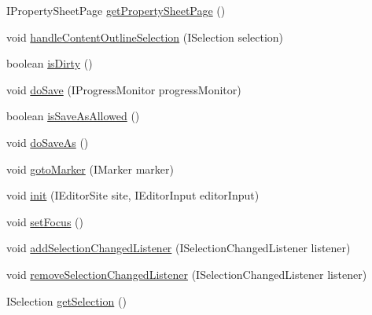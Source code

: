 \begin{DoxyCompactItemize}
\item 
I\-Property\-Sheet\-Page \hyperlink{classshootingmachineemfmodel_1_1presentation_1_1_shootingmachineemfmodel_editor_a897b207be7c583f065b40958b2db005c}{get\-Property\-Sheet\-Page} ()
\item 
void \hyperlink{classshootingmachineemfmodel_1_1presentation_1_1_shootingmachineemfmodel_editor_aff7e23f939ecf29b9648ae8f5eb70371}{handle\-Content\-Outline\-Selection} (I\-Selection selection)
\item 
boolean \hyperlink{classshootingmachineemfmodel_1_1presentation_1_1_shootingmachineemfmodel_editor_a7fd70f9ea055a835c70135220866e5ad}{is\-Dirty} ()
\item 
void \hyperlink{classshootingmachineemfmodel_1_1presentation_1_1_shootingmachineemfmodel_editor_a5c4817f88f4fbf12c72ef2a0aac06f84}{do\-Save} (I\-Progress\-Monitor progress\-Monitor)
\item 
boolean \hyperlink{classshootingmachineemfmodel_1_1presentation_1_1_shootingmachineemfmodel_editor_adb9b89b133860bb03109314d1358fede}{is\-Save\-As\-Allowed} ()
\item 
void \hyperlink{classshootingmachineemfmodel_1_1presentation_1_1_shootingmachineemfmodel_editor_a31e229dc1eafc259cad64918da13eb7c}{do\-Save\-As} ()
\item 
void \hyperlink{classshootingmachineemfmodel_1_1presentation_1_1_shootingmachineemfmodel_editor_a05a7f07d5fd373febe25b8ce6b2c8fdc}{goto\-Marker} (I\-Marker marker)
\item 
void \hyperlink{classshootingmachineemfmodel_1_1presentation_1_1_shootingmachineemfmodel_editor_a3195bcec0b92b023cabc23ec9c2ea758}{init} (I\-Editor\-Site site, I\-Editor\-Input editor\-Input)
\item 
void \hyperlink{classshootingmachineemfmodel_1_1presentation_1_1_shootingmachineemfmodel_editor_a9b206ef912c775a6da4a926d8f1479f7}{set\-Focus} ()
\item 
void \hyperlink{classshootingmachineemfmodel_1_1presentation_1_1_shootingmachineemfmodel_editor_addfa579caa2bfa6d6bc60d3d75625507}{add\-Selection\-Changed\-Listener} (I\-Selection\-Changed\-Listener listener)
\item 
void \hyperlink{classshootingmachineemfmodel_1_1presentation_1_1_shootingmachineemfmodel_editor_a6182253ead88a8ad3b4a94cfe89127fa}{remove\-Selection\-Changed\-Listener} (I\-Selection\-Changed\-Listener listener)
\item 
I\-Selection \hyperlink{classshootingmachineemfmodel_1_1presentation_1_1_shootingmachineemfmodel_editor_a7ef1c55b1e1e5745011c49699a356ca9}{get\-Selection} ()

\end{DoxyCompactItemize}
